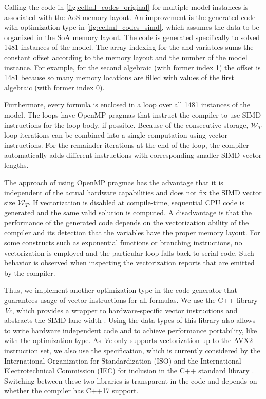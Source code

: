 Calling the code in \cref{fig:cellml_codes_original} for multiple model instances is associated with the AoS memory layout.
An improvement is the generated code with optimization type  in \cref{fig:cellml_codes_simd}, which assumes the data to be organized in the SoA memory layout. The code is generated specifically to solved 1481 instances of the model. The array indexing for the  and  variables sums the constant offset according to the memory layout and the number of the model instance. For example, for the second algebraic (with former index 1) the offset is 1481 because so many memory locations are filled with values of the first algebraic (with former index 0).

Furthermore, every formula is enclosed in a loop over all 1481 instances of the model. The loops have OpenMP pragmas that instruct the compiler to use SIMD instructions for the loop body, if possible. Because of the consecutive storage, $\mathcal{W}_T$ loop iterations can be combined into a single computation using vector instructions. For the remainder iterations at the end of the loop, the compiler automatically adds different instructions with corresponding smaller SIMD vector lengths.

The approach of using OpenMP pragmas has the advantage that it is independent of the actual hardware capabilities and does not fix the SIMD vector size $\mathcal{W}_T$. If vectorization is disabled at compile-time, sequential CPU code is generated and the same valid solution is computed. A disadvantage is that the performance of the generated code depends on the vectorization ability of the compiler and its detection that the variables have the proper memory layout. For some constructs such as exponential functions or branching instructions, no vectorization is employed and the particular loop falls back to serial code. Such behavior is observed when inspecting the vectorization reports that are emitted by the compiler.

Thus, we implement another optimization type  in the code generator that guarantees usage of vector instructions for all formulas. We use the C++ library \emph{Vc}, which provides a wrapper to hardware-specific vector instructions and abstracts the SIMD lane width \cite{vc2012,Kretz2015}. Using the data types of this library also allows to write hardware independent code and to achieve performance portability, like with the  optimization type. 
As \emph{Vc} only supports vectorization up to the AVX2 instruction set, we also use the  specification, which is currently considered by the International Organization for Standardization (ISO) and the International Electrotechnical Commission (IEC) for inclusion in the C++ standard library \cite{hoberock2016working}. Switching between these two libraries is transparent in the code and depends on whether the compiler has C++17 support.

